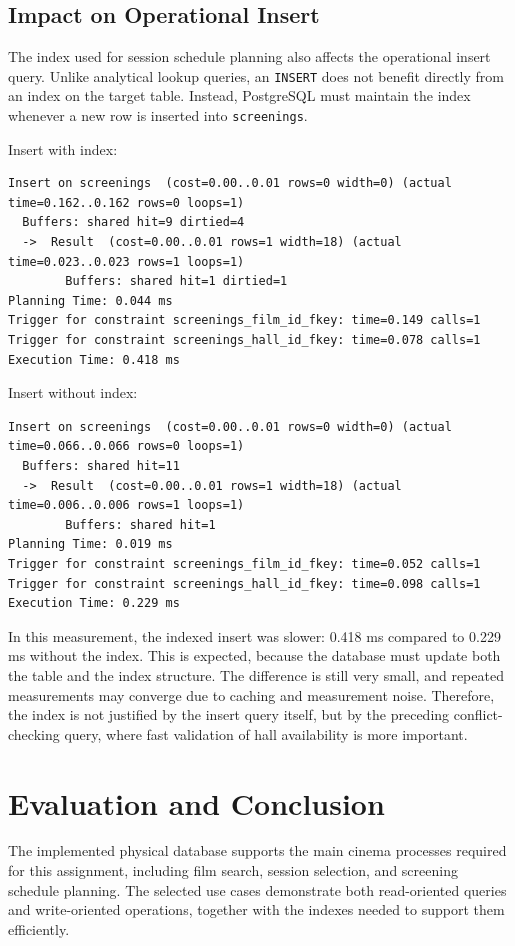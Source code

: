 \documentclass[11pt, a4paper]{article}
\begin{document}
\subsection{Impact on Operational Insert}
The index used for session schedule planning also affects the operational insert query.
Unlike analytical lookup queries, an \texttt{INSERT} does not benefit directly from an index on the target table.
Instead, PostgreSQL must maintain the index whenever a new row is inserted into \texttt{screenings}.

Insert with index:
\begin{lstlisting}
Insert on screenings  (cost=0.00..0.01 rows=0 width=0) (actual time=0.162..0.162 rows=0 loops=1)
  Buffers: shared hit=9 dirtied=4
  ->  Result  (cost=0.00..0.01 rows=1 width=18) (actual time=0.023..0.023 rows=1 loops=1)
        Buffers: shared hit=1 dirtied=1
Planning Time: 0.044 ms
Trigger for constraint screenings_film_id_fkey: time=0.149 calls=1
Trigger for constraint screenings_hall_id_fkey: time=0.078 calls=1
Execution Time: 0.418 ms
\end{lstlisting}

Insert without index:
\begin{lstlisting}
Insert on screenings  (cost=0.00..0.01 rows=0 width=0) (actual time=0.066..0.066 rows=0 loops=1)
  Buffers: shared hit=11
  ->  Result  (cost=0.00..0.01 rows=1 width=18) (actual time=0.006..0.006 rows=1 loops=1)
        Buffers: shared hit=1
Planning Time: 0.019 ms
Trigger for constraint screenings_film_id_fkey: time=0.052 calls=1
Trigger for constraint screenings_hall_id_fkey: time=0.098 calls=1
Execution Time: 0.229 ms
\end{lstlisting}

In this measurement, the indexed insert was slower: 0.418 ms compared to 0.229 ms without the index.
This is expected, because the database must update both the table and the index structure.
The difference is still very small, and repeated measurements may converge due to caching and measurement noise.
Therefore, the index is not justified by the insert query itself, but by the preceding conflict-checking query, where fast validation of hall availability is more important.

\section{Evaluation and Conclusion}
\label{sec:evaluation}

The implemented physical database supports the main cinema processes required for this assignment, including film search, session selection, and screening schedule planning.
The selected use cases demonstrate both read-oriented queries and write-oriented operations, together with the indexes needed to support them efficiently.
\end{document}
